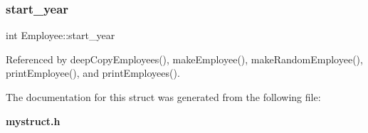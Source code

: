 \subsubsection{start\+\_\+year}
{\footnotesize\ttfamily int Employee\+::start\+\_\+year}



Referenced by deep\+Copy\+Employees(), make\+Employee(), make\+Random\+Employee(), print\+Employee(), and print\+Employees().



The documentation for this struct was generated from the following file\+:\begin{DoxyCompactItemize}
\item 
\textbf{ mystruct.\+h}\end{DoxyCompactItemize}

